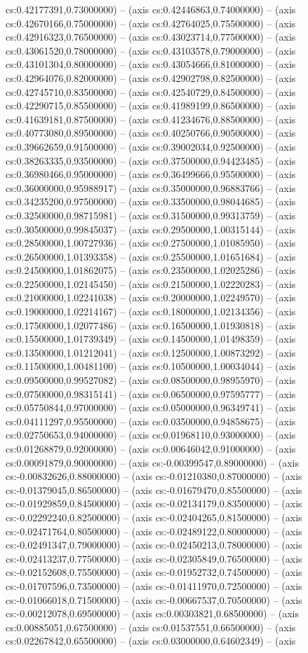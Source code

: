 cs:0.42177391,0.73000000) -- (axis cs:0.42446863,0.74000000) -- (axis cs:0.42670166,0.75000000) -- (axis cs:0.42764025,0.75500000) -- (axis cs:0.42916323,0.76500000) -- (axis cs:0.43023714,0.77500000) -- (axis cs:0.43061520,0.78000000) -- (axis cs:0.43103578,0.79000000) -- (axis cs:0.43101304,0.80000000) -- (axis cs:0.43054666,0.81000000) -- (axis cs:0.42964076,0.82000000) -- (axis cs:0.42902798,0.82500000) -- (axis cs:0.42745710,0.83500000) -- (axis cs:0.42540729,0.84500000) -- (axis cs:0.42290715,0.85500000) -- (axis cs:0.41989199,0.86500000) -- (axis cs:0.41639181,0.87500000) -- (axis cs:0.41234676,0.88500000) -- (axis cs:0.40773080,0.89500000) -- (axis cs:0.40250766,0.90500000) -- (axis cs:0.39662659,0.91500000) -- (axis cs:0.39002034,0.92500000) -- (axis cs:0.38263335,0.93500000) -- (axis cs:0.37500000,0.94423485) -- (axis cs:0.36980466,0.95000000) -- (axis cs:0.36499666,0.95500000) -- (axis cs:0.36000000,0.95988917) -- (axis cs:0.35000000,0.96883766) -- (axis cs:0.34235200,0.97500000) -- (axis cs:0.33500000,0.98044685) -- (axis cs:0.32500000,0.98715981) -- (axis cs:0.31500000,0.99313759) -- (axis cs:0.30500000,0.99845037) -- (axis cs:0.29500000,1.00315144) -- (axis cs:0.28500000,1.00727936) -- (axis cs:0.27500000,1.01085950) -- (axis cs:0.26500000,1.01393358) -- (axis cs:0.25500000,1.01651684) -- (axis cs:0.24500000,1.01862075) -- (axis cs:0.23500000,1.02025286) -- (axis cs:0.22500000,1.02145450) -- (axis cs:0.21500000,1.02220283) -- (axis cs:0.21000000,1.02241038) -- (axis cs:0.20000000,1.02249570) -- (axis cs:0.19000000,1.02214167) -- (axis cs:0.18000000,1.02134356) -- (axis cs:0.17500000,1.02077486) -- (axis cs:0.16500000,1.01930818) -- (axis cs:0.15500000,1.01739349) -- (axis cs:0.14500000,1.01498359) -- (axis cs:0.13500000,1.01212041) -- (axis cs:0.12500000,1.00873292) -- (axis cs:0.11500000,1.00481100) -- (axis cs:0.10500000,1.00034044) -- (axis cs:0.09500000,0.99527082) -- (axis cs:0.08500000,0.98955970) -- (axis cs:0.07500000,0.98315141) -- (axis cs:0.06500000,0.97595777) -- (axis cs:0.05750844,0.97000000) -- (axis cs:0.05000000,0.96349741) -- (axis cs:0.04111297,0.95500000) -- (axis cs:0.03500000,0.94858675) -- (axis cs:0.02750653,0.94000000) -- (axis cs:0.01968110,0.93000000) -- (axis cs:0.01268879,0.92000000) -- (axis cs:0.00646042,0.91000000) -- (axis cs:0.00091879,0.90000000) -- (axis cs:-0.00399547,0.89000000) -- (axis cs:-0.00832626,0.88000000) -- (axis cs:-0.01210380,0.87000000) -- (axis cs:-0.01379045,0.86500000) -- (axis cs:-0.01679470,0.85500000) -- (axis cs:-0.01929859,0.84500000) -- (axis cs:-0.02134179,0.83500000) -- (axis cs:-0.02292240,0.82500000) -- (axis cs:-0.02404265,0.81500000) -- (axis cs:-0.02471764,0.80500000) -- (axis cs:-0.02489122,0.80000000) -- (axis cs:-0.02491347,0.79000000) -- (axis cs:-0.02450213,0.78000000) -- (axis cs:-0.02413237,0.77500000) -- (axis cs:-0.02305849,0.76500000) -- (axis cs:-0.02152608,0.75500000) -- (axis cs:-0.01952732,0.74500000) -- (axis cs:-0.01707596,0.73500000) -- (axis cs:-0.01411970,0.72500000) -- (axis cs:-0.01066018,0.71500000) -- (axis cs:-0.00667537,0.70500000) -- (axis cs:-0.00212078,0.69500000) -- (axis cs:0.00303821,0.68500000) -- (axis cs:0.00885051,0.67500000) -- (axis cs:0.01537551,0.66500000) -- (axis cs:0.02267842,0.65500000) -- (axis cs:0.03000000,0.64602349) -- (axis 